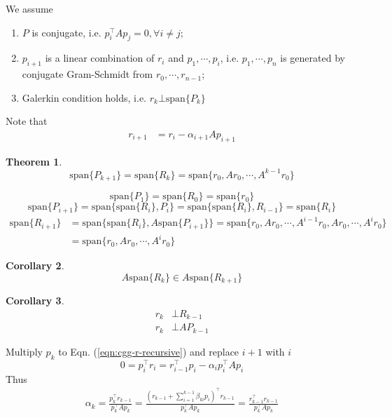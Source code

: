 \documentclass{article}
\newtheorem{theorem}{Theorem}[section]
\newtheorem{corollary}[theorem]{Corollary}
\newenvironment{proof}[1][Proof]{\begin{trivlist}
\item[\hskip \labelsep {\bfseries #1}]}{\end{trivlist}}
\newcommand{\qed}{\nobreak \ifvmode \relax \else
      \ifdim\lastskip<1.5em \hskip-\lastskip
      \hskip1.5em plus0em minus0.5em \fi \nobreak
      \vrule height0.75em width0.5em depth0.25em\fi}
\newcommand{\vspan}[1]{\textrm{span}\{#1\}}
\begin{document}
We assume
\begin{enumerate}
    \item $P$ is conjugate, i.e. $p_i^\top A p_j = 0, \forall i\ne j$;
    \item $p_{i+1}$ is a linear combination of $r_i$ and $p_1, \cdots, p_i$, i.e. $p_1, \cdots, p_n$ is generated by conjugate Gram-Schmidt from $r_0, \cdots, r_{n-1}$;
    \item Galerkin condition holds, i.e. $r_k \bot \vspan{P_k}$
\end{enumerate}

Note that
\begin{align*}
r_{i+1} &= r_{i} - \alpha_{i+1}Ap_{i+1}  \label{eqn:cgg-r-recursive}
\end{align*}

\begin{theorem}
$$\vspan{P_{k+1}} = \vspan{R_{k}} = \vspan{r_0, Ar_0, \cdots, A^{k-1}r_0}$$
\end{theorem}
\begin{proof}
$$\vspan{P_1} = \vspan{R_0} = \vspan{r_0}$$
$$\vspan{P_{i+1}} = \vspan{\vspan{R_i}, P_i} = \vspan{\vspan{R_i}, R_{i-1}} = \vspan{R_i} $$
\begin{align*}
\vspan{R_{i+1}} &= \vspan{\vspan{R_i}, A\vspan{P_{i+1}}} = \vspan{r_0, Ar_0, \cdots, A^{i-1}r_0, Ar_0, \cdots, A^i r_0} \\
        &= \vspan{r_0, Ar_0, \cdots, A^{i}r_0}
\end{align*}\qed
\end{proof}

\begin{corollary}
$$A\vspan{R_k} \in A\vspan{R_{k+1}}$$
\end{corollary}

\begin{corollary}
\begin{align*}
r_k &\bot R_{k-1} \\
r_k &\bot AP_{k-1} 
\end{align*}
\end{corollary}

Multiply $p_k$ to Eqn. (\ref{eqn:cgg-r-recursive}) and replace $i+1$ with $i$
$$0 = p_i^\top r_i = r_{i-1}^\top p_i - \alpha_i p_i^\top A p_i$$
Thus
\begin{align}
\alpha_k = \frac{p_k^\top r_{k-1}}{p_k^\top A p_k} = \frac{(r_{k-1} + \sum_{i=1}^{k-1}\beta_{ki} p_i)^\top r_{k-1}}{p_k^\top A p_k} = \frac{r_{k-1}^\top r_{k-1}}{p_k^\top A p_k}
\end{align}
\end{document}
